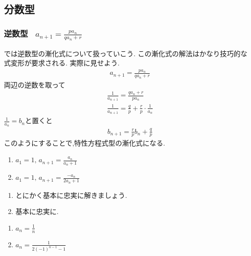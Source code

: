 
\subsection{分数型}\label{節：分数型}
  \subsubsection{\texorpdfstring{逆数型  \, $\displaystyle a_{n+1}=\frac{pa_n}{qa_n+r}$}{逆数型}}
    では逆数型の漸化式について扱っていこう.
    この漸化式の解法はかなり技巧的な式変形が要求される.
    実際に見せよう.
    \begin{align*}
      &a_{n+1}=\frac{pa_n}{qa_n+r}
    \end{align*}
      両辺の逆数を取って
    \begin{align*}
      &\frac{1}{a_{n+1}}=\frac{qa_n+r}{pa_n}\\
      &\frac{1}{a_{n+1}}=\frac{q}{p}+\frac{r}{p}\cdot\frac{1}{a_n}
    \end{align*}
    $\displaystyle \frac{1}{a_n}=b_n$と置くと
    \begin{align*}
      &b_{n+1}=\frac{r}{p}b_n+\frac{q}{p}
    \end{align*}
    このようにすることで,特性方程式型の漸化式になる.

    \noindent {}
    \begin{enumerate}[label=(\arabic*),parsep=3pt,format=\bookitemlink{example-fractional-1}{problem}{answer}]
      \item $\displaystyle a_1=1,\, a_{n+1}=\frac{a_n}{a_n+1}$
      \item $\displaystyle a_1=1,\, a_{n+1}=\frac{-a_n}{2a_n+1}$
    \end{enumerate}

    \noindent{}
    \begin{enumerate}[label=(\arabic*),parsep=3pt,format=\bookitemlink{example-fractional-1}{hint}{problem}]
      \item とにかく基本に忠実に解きましょう.
      \item 基本に忠実に.
    \end{enumerate}

    \noindent{}
    \begin{enumerate}[label=(\arabic*),parsep=3pt,format=\bookitemlink{example-fractional-1}{answer}{problem}]
      \item $\displaystyle a_n=\frac{1}{n}$
      \item $\displaystyle a_n=\frac{1}{2(-1)^{n-1}-1}$
    \end{enumerate}

